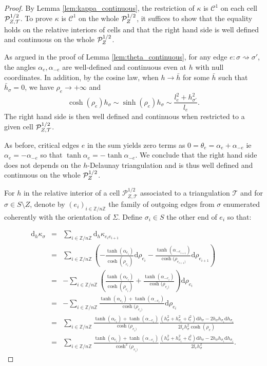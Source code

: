\documentclass[a4paper,12pt]{article}
\def\ZZ{\mathbb{Z}}
\def\TT{\mathcal T}
\def\adm{\P}
\def\d{\mathrm{d}}
\def\d{\mathrm{d}}
\def\adm{\mathcal{P}}
\def\P{\mathcal{P}}
\theoremstyle{definition}
\begin{document}
					\begin{proof}
					By Lemma \ref{lem:kappa_continuous}, the restriction of $\kappa$ is $\mathscr C^1$ on each cell $\Psq_{Z,\TT}$.
					To prove $\kappa$ is $\mathscr C^1$ on the whole $\Psq_Z$, it suffices to show that the equality holds on the relative interiors of cells and that 
					the right hand side is well defined and continuous on the whole $\Psq_Z$.
					
                    As argued in the proof of Lemma \ref{lem:theta_continuous}, for any edge $e:\sigma \rightsquigarrow \sigma'$, the angles $\alpha_e,\alpha_{-e}$  are well-defined and continuous even at $h$ with null coordinates. In addition, by the cosine law, when $h \rightarrow \bar h$ for some $\bar h$ such that $\bar h_\sigma=0$, we have  $\rho_e\rightarrow +\infty$ and $$\cosh (\rho_e) h_\sigma \sim \sinh (\rho_e) h_\sigma \sim \frac{l_e^2+h_{\sigma'}^2}{l_e}.$$ 
                    The right hand side is then well defined and continuous when restricted to a given cell $\Psq_{Z,\TT}$. 
                    
                    As before, critical edges $e$ in the sum yields zero terms as $0=\theta_e=\alpha_e+\alpha_{-e}$ ie $\alpha_e=-\alpha_{-e}$ so that $\tanh \alpha_e=-\tanh\alpha_{-e}$.
                    We conclude that the right hand side does not depends on the $h$-Delaunay triangulation and is thus well defined and continuous on the whole $\Psq_Z$.
						
                    For $h$ in the relative interior of a cell $\adm_{Z,\TT}^{1/2}$ associated to a triangulation $\TT$ and for $\sigma\in S\setminus Z$, denote by $(e_i)_{i\in \ZZ/n\ZZ}$ the family of outgoing edges from $\sigma$ enumerated coherently with the orientation of $\Sigma$. Define $\sigma_i\in S$ the other end of $e_i$ so that:

					 \begin{eqnarray*}
					 \d_h \kappa_\sigma &=& \sum_{i\in \ZZ/n\ZZ} \d_h \kappa_{e_i e_{i+1}}\\
					 &=& \sum_{i\in \ZZ/n\ZZ} \left(-\frac{\tanh(\alpha_{e_i})}{\cosh(\rho_{e_i})} \d \rho_{e_i}-
					 \frac{\tanh(\alpha_{-e_{i+1}})} {\cosh(\rho_{e_{i+1})}}\d \rho_{e_{i+1}}\right)\\
					 &=&-\sum_{i\in \ZZ/n\ZZ} \left(\frac{\tanh(\alpha_{e_i})}{\cosh(\rho_{e_i})}+
					 \frac{\tanh(\alpha_{-e_{i}})} {\cosh(\rho_{e_{i})}}\right)\d \rho_{e_{i}}\\
					 &=& -\sum_{i\in \ZZ/n\ZZ}\frac{\tanh(\alpha_{e_i})+
					 \tanh(\alpha_{-e_{i}})} {\cosh(\rho_{e_{i})}}\d \rho_{e_{i}}\\
					 &=&\sum_{i\in \ZZ/n\ZZ}\frac{\tanh(\alpha_{e_i})+
					 \tanh(\alpha_{-e_{i}})} {\cosh(\rho_{e_{i})}} \frac{(h_{\sigma}^2+h_{\sigma_i}^2+l_e^2)\d h_{\sigma} - 2 h_{\sigma} h_{\sigma_i} \d h_{\sigma_i} }{2 l_e h_{\sigma}^2\cosh(\rho_{e})}\\
					 &=&\sum_{i\in \ZZ/n\ZZ}\frac{\tanh(\alpha_{e_i})+
					 \tanh(\alpha_{-e_{i}})} {\cosh^2(\rho_{e_{i})}} \frac{(h_{\sigma}^2+h_{\sigma_i}^2+l_e^2)\d h_{\sigma} - 2 h_{\sigma} h_{\sigma_i} \d h_{\sigma_i} }{2 l_e h_{\sigma}^2}.
					 \end{eqnarray*}
					\end{proof}
\end{document}
